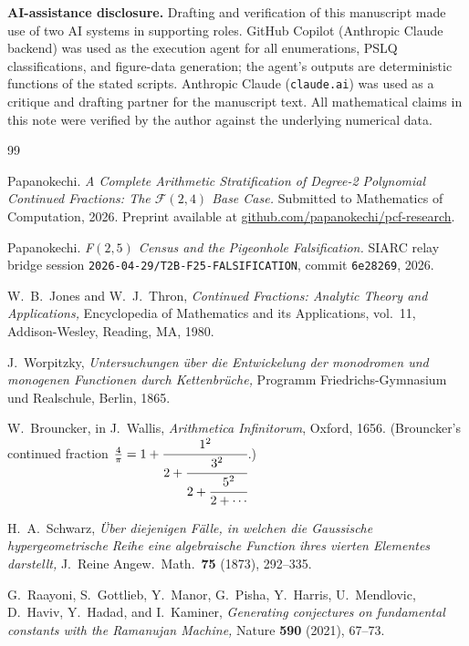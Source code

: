 \documentclass[11pt]{amsart}
\theoremstyle{definition}
\theoremstyle{remark}
\newcommand{\FF}{\mathcal{F}}
\begin{document}
\textbf{AI-assistance disclosure.}  Drafting and verification of this
manuscript made use of two AI systems in supporting roles.
GitHub Copilot (Anthropic Claude backend) was used as the execution
agent for all enumerations, PSLQ classifications, and figure-data
generation; the agent's outputs are deterministic functions of the
stated scripts.  Anthropic Claude (\texttt{claude.ai}) was used as a
critique and drafting partner for the manuscript text.  All
mathematical claims in this note were verified by the author against
the underlying numerical data.

\begin{thebibliography}{99}

Papanokechi.
\emph{A Complete Arithmetic Stratification of Degree-2 Polynomial
Continued Fractions: The $\FF(2,4)$ Base Case.}
Submitted to Mathematics of Computation, 2026.
Preprint available at
\href{https://github.com/papanokechi/pcf-research}%
{github.com/papanokechi/pcf-research}.

Papanokechi.
\emph{F$(2,5)$ Census and the Pigeonhole Falsification.}
SIARC relay bridge session
\texttt{2026-04-29/T2B-F25-FALSIFICATION}, commit \texttt{6e28269},
2026.

W.~B.~Jones and W.~J.~Thron,
\emph{Continued Fractions: Analytic Theory and Applications,}
Encyclopedia of Mathematics and its Applications, vol.~11,
Addison-Wesley, Reading, MA, 1980.

J.~Worpitzky,
\emph{Untersuchungen \"uber die Entwickelung der monodromen und
monogenen Functionen durch Kettenbr\"uche,}
Programm Friedrichs-Gymnasium und Realschule, Berlin, 1865.

W.~Brouncker, in J.~Wallis,
\emph{Arithmetica Infinitorum}, Oxford, 1656.
(Brouncker's continued fraction $\tfrac{4}{\pi}
= 1 + \cfrac{1^2}{2 + \cfrac{3^2}{2 + \cfrac{5^2}{2+\cdots}}}$.)

H.~A.~Schwarz,
\emph{\"Uber diejenigen F\"alle, in welchen die Gauss\-ische
hypergeometrische Reihe eine algebraische Function ihres vierten
Elementes darstellt,}
J.\ Reine Angew.\ Math.\ \textbf{75} (1873), 292--335.

G.~Raayoni, S.~Gottlieb, Y.~Manor, G.~Pisha, Y.~Harris, U.~Mendlovic,
D.~Haviv, Y.~Hadad, and I.~Kaminer,
\emph{Generating conjectures on fundamental constants with the
Ramanujan Machine,}
Nature \textbf{590} (2021), 67--73.

\end{thebibliography}
\end{document}
